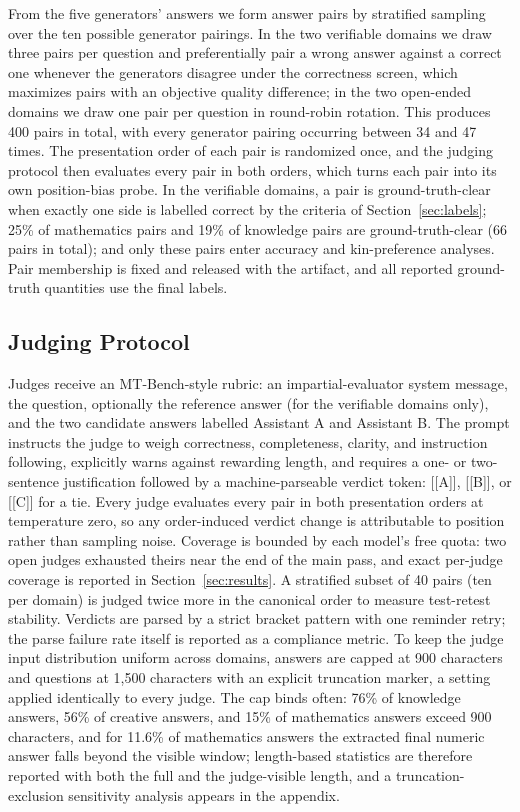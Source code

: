 \documentclass[review,12pt]{elsarticle}
\begin{document}
From the five generators' answers we form answer pairs by stratified
sampling over the ten possible generator pairings. In the two verifiable
domains we draw three pairs per question and preferentially pair a wrong
answer against a correct one whenever the generators disagree under the
correctness screen, which maximizes pairs with an objective quality
difference; in the two
open-ended domains we draw one pair per question in round-robin rotation.
This produces 400 pairs in total, with every generator pairing occurring
between 34 and 47 times. The presentation order of each pair is randomized
once, and the judging protocol then evaluates every pair in both orders,
which turns each pair into its own position-bias probe. In the verifiable
domains, a pair is ground-truth-clear when exactly one side is labelled
correct by the criteria of Section~\ref{sec:labels}; 25\% of mathematics pairs and 19\% of knowledge pairs are
ground-truth-clear (66 pairs in total);
and only these pairs enter accuracy and kin-preference analyses. Pair
membership is fixed and released with the artifact, and all reported
ground-truth quantities use the final labels.

\subsection{Judging Protocol}
\label{sec:protocol}

Judges receive an MT-Bench-style rubric: an impartial-evaluator system
message, the question, optionally the reference answer (for the verifiable
domains only), and the two candidate answers labelled Assistant A and
Assistant B. The prompt instructs the judge to weigh correctness,
completeness, clarity, and instruction following, explicitly warns against
rewarding length, and requires a one- or two-sentence justification followed
by a machine-parseable verdict token: [[A]], [[B]], or [[C]] for a tie. Every
judge evaluates every pair in both presentation orders at temperature zero,
so any order-induced verdict change is attributable to position rather than
sampling noise. Coverage is bounded by each model's free quota: two open
judges exhausted theirs near the end of the main pass, and exact per-judge
coverage is reported in Section~\ref{sec:results}. A stratified subset of 40 pairs (ten per domain) is judged
twice more in the canonical order to measure test-retest stability. Verdicts
are parsed by a strict bracket pattern with one reminder retry; the parse
failure rate itself is reported as a compliance metric. To keep the judge
input distribution uniform across domains, answers are capped at 900
characters and questions at 1{,}500 characters with an explicit truncation
marker, a setting applied identically to every judge. The cap binds often:
76\% of knowledge answers, 56\% of creative answers, and 15\% of
mathematics answers exceed 900 characters, and for 11.6\% of mathematics
answers the extracted final numeric answer falls beyond the visible
window; length-based statistics are therefore reported with both the full
and the judge-visible length, and a truncation-exclusion sensitivity
analysis appears in the appendix.
\end{document}
